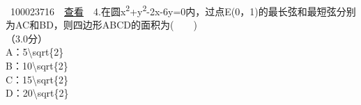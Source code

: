 ~{{100023716}~~\href{../question/viewQuestionDetail.jsp?questionID=100023716\&testPaperId=100229072}{查看}~~4.在圆x\textsuperscript{2}+y\textsuperscript{2}-2x-6y=0内，过点E(0，1)的最长弦和最短弦分别为AC和BD，则四边形ABCD的面积为(　　)\\
\hspace*{0.333em}\hspace*{0.333em}（3.0分）\\
\hspace*{0.333em}\hspace*{0.333em}\hspace*{0.333em}\hspace*{0.333em}\hspace*{0.333em}\hspace*{0.333em}\hspace*{0.333em}\hspace*{0.333em}A：5{\textbackslash{}sqrt\{2\}}\protect\hypertarget{_baidu_bookmark_start_0}{}{‍}\\
\hspace*{0.333em}\hspace*{0.333em}\hspace*{0.333em}\hspace*{0.333em}\hspace*{0.333em}\hspace*{0.333em}\hspace*{0.333em}\hspace*{0.333em}B：10{\textbackslash{}sqrt\{2\}}\protect\hypertarget{_baidu_bookmark_start_1}{}{‍}\\
\hspace*{0.333em}\hspace*{0.333em}\hspace*{0.333em}\hspace*{0.333em}\hspace*{0.333em}\hspace*{0.333em}\hspace*{0.333em}\hspace*{0.333em}C：15{\textbackslash{}sqrt\{2\}}\protect\hypertarget{_baidu_bookmark_start_2}{}{‍}\\
\hspace*{0.333em}\hspace*{0.333em}\hspace*{0.333em}\hspace*{0.333em}\hspace*{0.333em}\hspace*{0.333em}\hspace*{0.333em}\hspace*{0.333em}D：20{\textbackslash{}sqrt\{2\}}\\
}

